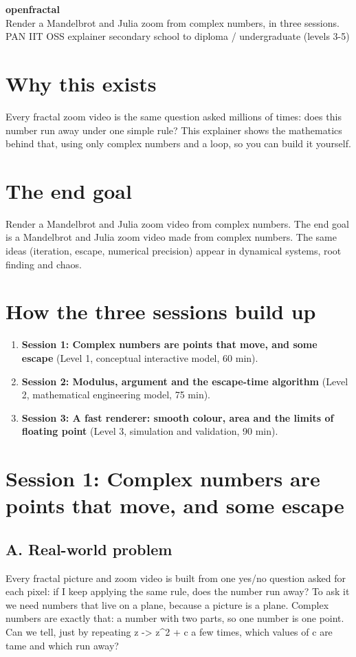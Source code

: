 \documentclass[11pt,a4paper]{article}
\begin{document}
\begin{center}{\LARGE\bfseries openfractal}\\[0.4em]{\large Render a Mandelbrot and Julia zoom from complex numbers, in three sessions.}\\[0.2em]\small PAN IIT OSS explainer \textbullet{} secondary school to diploma / undergraduate (levels 3-5)\end{center}

\section*{Why this exists}
Every fractal zoom video is the same question asked millions of times: does this number run away under one simple rule? This explainer shows the mathematics behind that, using only complex numbers and a loop, so you can build it yourself.

\section*{The end goal}
Render a Mandelbrot and Julia zoom video from complex numbers. The end goal is a Mandelbrot and Julia zoom video made from complex numbers. The same ideas (iteration, escape, numerical precision) appear in dynamical systems, root finding and chaos.

\section*{How the three sessions build up}
\begin{enumerate}[nosep]
\item \textbf{Session 1: Complex numbers are points that move, and some escape} (Level 1, conceptual interactive model, 60 min).
\item \textbf{Session 2: Modulus, argument and the escape-time algorithm} (Level 2, mathematical engineering model, 75 min).
\item \textbf{Session 3: A fast renderer: smooth colour, area and the limits of floating point} (Level 3, simulation and validation, 90 min).
\end{enumerate}

\section{Session 1: Complex numbers are points that move, and some escape}

\subsection*{A. Real-world problem}
Every fractal picture and zoom video is built from one yes/no question asked for each pixel: if I keep applying the same rule, does the number run away? To ask it we need numbers that live on a plane, because a picture is a plane. Complex numbers are exactly that: a number with two parts, so one number is one point. Can we tell, just by repeating z -\textgreater{} z\textasciicircum{}2 + c a few times, which values of c are tame and which run away?
\end{document}
